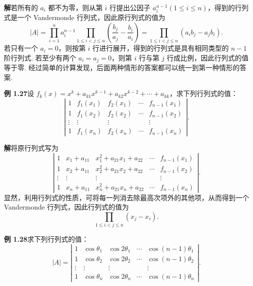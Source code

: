 \documentclass[UTF8,12pt,a4paper,fontset=fandol]{ctexart}
\begin{document}
\noindent\textbf{解}\quad 若所有的 $a_i$ 都不为零，则从第 $i$ 行提出公因子 $a_i^{n-1}(1\le i\le n)$，得到的行列式是一个 Vandermonde 行列式，因此原行列式的值为
\[
|A|=\prod_{i=1}^n a_i^{n-1}\prod_{1\le i<j\le n}\left(\frac{b_j}{a_j}-\frac{b_i}{a_i}\right)
=\prod_{1\le i<j\le n}(a_ib_j-a_jb_i).
\]
若只有一个 $a_i=0$，则按第 $i$ 行进行展开，得到的行列式是具有相同类型的 $n-1$ 阶行列式. 若至少有两个 $a_i=a_j=0$，则第 $i$ 行与第 $j$ 行成比例，因此行列式的值等于零. 经过简单的计算发现，后面两种情形的答案都可以统一到第一种情形的答案.

\noindent\textbf{例 1.27}\quad 设 $f_k(x)=x^k+a_{k1}x^{k-1}+a_{k2}x^{k-2}+\cdots+a_{kk}$，求下列行列式的值：
\[
\left|\begin{array}{ccccc}
1 & f_1(x_1) & f_2(x_1) & \cdots & f_{n-1}(x_1)\\
1 & f_1(x_2) & f_2(x_2) & \cdots & f_{n-1}(x_2)\\
\vdots & \vdots & \vdots &        & \vdots\\
1 & f_1(x_n) & f_2(x_n) & \cdots & f_{n-1}(x_n)
\end{array}\right|.
\]

\noindent\textbf{解}\quad 将原行列式写为
\[
\left|\begin{array}{ccccc}
1 & x_1+a_{11} & x_1^2+a_{21}x_1+a_{22} & \cdots & f_{n-1}(x_1)\\
1 & x_2+a_{11} & x_2^2+a_{21}x_2+a_{22} & \cdots & f_{n-1}(x_2)\\
\vdots & \vdots & \vdots &        & \vdots\\
1 & x_n+a_{11} & x_n^2+a_{21}x_n+a_{22} & \cdots & f_{n-1}(x_n)
\end{array}\right|.
\]
显然，利用行列式的性质，可将每一列消去除最高次项外的其他项，从而得到一个 Vandermonde 行列式，因此行列式的值为
\[
\prod_{1\le i<j\le n}(x_j-x_i).
\]

\noindent\textbf{例 1.28}\quad 求下列行列式的值：
\[
|A|=\left|\begin{array}{ccccc}
1 & \cos\theta_1 & \cos2\theta_1 & \cdots & \cos(n-1)\theta_1\\
1 & \cos\theta_2 & \cos2\theta_2 & \cdots & \cos(n-1)\theta_2\\
\vdots & \vdots & \vdots &        & \vdots\\
1 & \cos\theta_n & \cos2\theta_n & \cdots & \cos(n-1)\theta_n
\end{array}\right|.
\]
\end{document}
